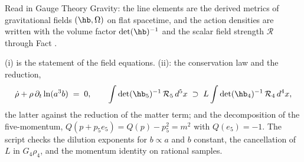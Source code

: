 Read in Gauge Theory Gravity: the line elements are the derived metrics of gravitational fields $(\hb, \Omega)$ on flat spacetime, and the action densities are written with the volume factor $\det(\hb)^{-1}$ and the scalar field strength $\mathcal{R}$ through Fact .

(i) is the statement of the field equations. (ii): the conservation law and the reduction,
\[
\dot\rho + \rho\,\partial_{t}\ln(a^{3}b) \;=\; 0, \qquad \int\det(\hb_{5})^{-1}\,\mathcal{R}_{5}\,d^{5}x \;\supset\; L\int\det(\hb_{4})^{-1}\,\mathcal{R}_{4}\,d^{4}x,
\]
the latter against the reduction of the matter term; and the decomposition of the five-momentum, $Q(p + p_{5}e_{5}) = Q(p) - p_{5}^{2} = m^{2}$ with $Q(e_5) = -1$. The script checks the dilution exponents for $b \propto a$ and $b$ constant, the cancellation of $L$ in $G_{4}\rho_{4}$, and the momentum identity on rational samples.
